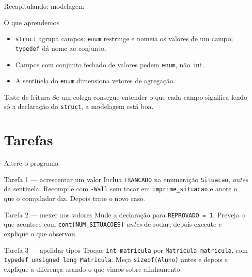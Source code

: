 \documentclass[aspectratio=169]{beamer}
\begin{document}
\begin{frame}{Recapitulando: modelagem}
  \begin{block}{O que aprendemos}
    \begin{itemize}
      \item \texttt{struct} agrupa campos; \texttt{enum} restringe e nomeia os
        valores de um campo; \texttt{typedef} dá nome ao conjunto.
      \item Campos com conjunto fechado de valores pedem \texttt{enum}, não \texttt{int}.
      \item A sentinela do \texttt{enum} dimensiona vetores de agregação.
    \end{itemize}
  \end{block}
  \begin{exampleblock}{Teste de leitura}
    Se um colega consegue entender o que cada campo significa lendo só a
    declaração do \texttt{struct}, a modelagem está boa.
  \end{exampleblock}
\end{frame}

\section{Tarefas}

\begin{frame}{Altere o programa}
  \begin{block}{Tarefa 1 --- acrescentar um valor}
    Inclua \texttt{TRANCADO} na enumeração \texttt{Situacao}, \emph{antes} da
    sentinela. Recompile com \texttt{-Wall} sem tocar em
    \texttt{imprime\_situacao} e anote o que o compilador diz. Depois trate o
    novo caso.
  \end{block}
  \begin{block}{Tarefa 2 --- mexer nos valores}
    Mude a declaração para \texttt{REPROVADO = 1}. Preveja o que acontece com
    \texttt{cont[NUM\_SITUACOES]} \emph{antes} de rodar; depois execute e
    explique o que observou.
  \end{block}
  \begin{block}{Tarefa 3 --- apelidar tipos}
    Troque \texttt{int matricula} por \texttt{Matricula matricula}, com
    \texttt{typedef unsigned long Matricula}. Meça \texttt{sizeof(Aluno)} antes
    e depois e explique a diferença usando o que vimos sobre alinhamento.
  \end{block}
\end{frame}
\end{document}
